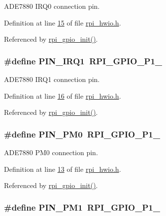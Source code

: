 A\-D\-E7880 I\-R\-Q0 connection pin. 



Definition at line \hyperlink{a00039_source_l00015}{15} of file \hyperlink{a00039_source}{rpi\-\_\-hwio.\-h}.



Referenced by \hyperlink{a00038_source_l00063}{rpi\-\_\-gpio\-\_\-init()}.

\hypertarget{a00039_a14204df3192ece77fc1b651c6625bc30}{
\subsubsection[{P\-I\-N\-\_\-\-I\-R\-Q1}]{\setlength{\rightskip}{0pt plus 5cm}\#define P\-I\-N\-\_\-\-I\-R\-Q1~R\-P\-I\-\_\-\-G\-P\-I\-O\-\_\-\-P1\-\_}}\label{d3/de7/a00039_a14204df3192ece77fc1b651c6625bc30}


A\-D\-E7880 I\-R\-Q1 connection pin. 



Definition at line \hyperlink{a00039_source_l00016}{16} of file \hyperlink{a00039_source}{rpi\-\_\-hwio.\-h}.



Referenced by \hyperlink{a00038_source_l00063}{rpi\-\_\-gpio\-\_\-init()}.

\hypertarget{a00039_aef7884a448449013ba1f8b46b8df5c05}{
\subsubsection[{P\-I\-N\-\_\-\-P\-M0}]{\setlength{\rightskip}{0pt plus 5cm}\#define P\-I\-N\-\_\-\-P\-M0~R\-P\-I\-\_\-\-G\-P\-I\-O\-\_\-\-P1\-\_}}\label{d3/de7/a00039_aef7884a448449013ba1f8b46b8df5c05}


A\-D\-E7880 P\-M0 connection pin. 



Definition at line \hyperlink{a00039_source_l00013}{13} of file \hyperlink{a00039_source}{rpi\-\_\-hwio.\-h}.



Referenced by \hyperlink{a00038_source_l00063}{rpi\-\_\-gpio\-\_\-init()}.

\hypertarget{a00039_a93e6f13f663a3ca8bcf6efe2022c9b78}{
\subsubsection[{P\-I\-N\-\_\-\-P\-M1}]{\setlength{\rightskip}{0pt plus 5cm}\#define P\-I\-N\-\_\-\-P\-M1~R\-P\-I\-\_\-\-G\-P\-I\-O\-\_\-\-P1\-\_}}\label{d3/de7/a00039_a93e6f13f663a3ca8bcf6efe2022c9b78}


